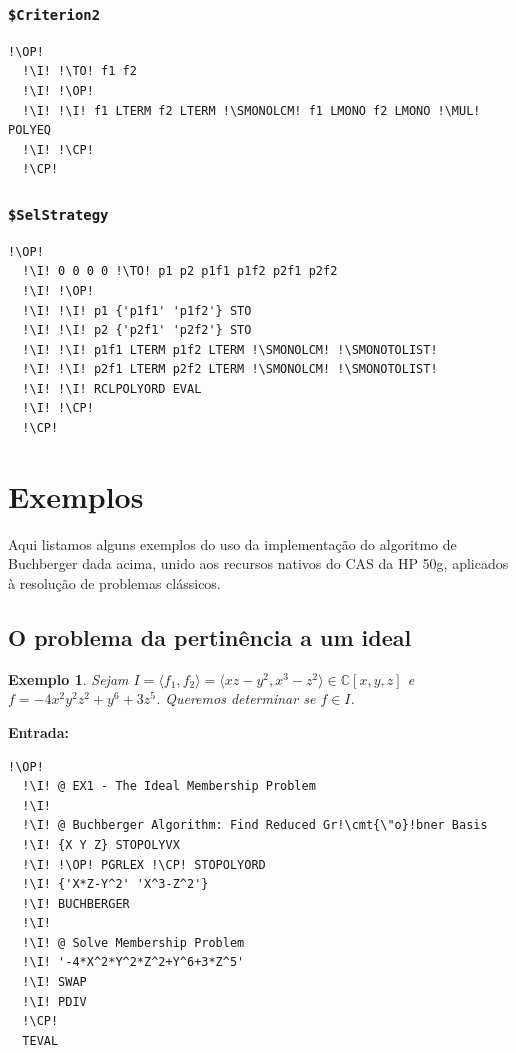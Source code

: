 \documentclass[12pt,a4paper]{report}
\newcommand{\kwd}[1]{\texttt{\textcolor{keyword}{#1}}}
\newcommand{\cmt}[1]{\texttt{\textcolor{comment}{#1}}}
\newcommand{\I}{\enspace\textcolor{indent}\vrule\hspace{2pt}}
\newcommand{\MUL}{\kwd{*}}   %
\newcommand{\SMONOTOLIST}{\kwd{\$MONO{$\rightarrow$}LIST}}   %
\newcommand{\SMONOLCM}{\kwd{\$MONOLCM}}   %
\newcommand{\SCriterionTwo}{\kwd{\$Criterion2}}   %
\newcommand{\SSelStrategy}{\kwd{\$SelStrategy}}   %
\newcommand{\OP}{\kwd{$\ll$}}   %
\newcommand{\CP}{\kwd{$\gg$}}   %
\newcommand{\TO}{\kwd{$\rightarrow$}} %
\newcommand{\C}{\mathbb{C}}
\newtheorem{example}[theorem]{Exemplo}
\numberwithin{theorem}{chapter}
\begin{document}
\subsubsection{\SCriterionTwo}\label{SCriterionTwo}
\begin{lstlisting}[language=userrpl]
  !\OP!
  !\I! !\TO! f1 f2
  !\I! !\OP!
  !\I! !\I! f1 LTERM f2 LTERM !\SMONOLCM! f1 LMONO f2 LMONO !\MUL! POLYEQ
  !\I! !\CP!
  !\CP!
\end{lstlisting}

\subsubsection{\SSelStrategy}\label{SSelStrategy}
\begin{lstlisting}[language=userrpl]
  !\OP!
  !\I! 0 0 0 0 !\TO! p1 p2 p1f1 p1f2 p2f1 p2f2
  !\I! !\OP!
  !\I! !\I! p1 {'p1f1' 'p1f2'} STO
  !\I! !\I! p2 {'p2f1' 'p2f2'} STO
  !\I! !\I! p1f1 LTERM p1f2 LTERM !\SMONOLCM! !\SMONOTOLIST!
  !\I! !\I! p2f1 LTERM p2f2 LTERM !\SMONOLCM! !\SMONOTOLIST!
  !\I! !\I! RCLPOLYORD EVAL
  !\I! !\CP!
  !\CP!
\end{lstlisting}



\section{Exemplos}\label{buchex}

Aqui listamos alguns exemplos do uso da implementação do algoritmo de
Buchberger dada acima, unido aos recursos nativos do CAS da HP 50g,
aplicados à resolução de problemas clássicos.


\subsection{O problema da pertinência a um ideal}

\begin{example}
  Sejam \(I=\langle f_1, f_2 \rangle = \langle x z - y^2, x^3-z^2
  \rangle \in \C[x,y,z]\) e \(f = -4x^2y^2z^2+y^6+3z^5\). Queremos
  determinar se \(f \in I\).
\end{example}

\noindent\textbf{Entrada:}

\begin{lstlisting}[language=userrpl]
  !\OP!
  !\I! @ EX1 - The Ideal Membership Problem
  !\I!
  !\I! @ Buchberger Algorithm: Find Reduced Gr!\cmt{\"o}!bner Basis
  !\I! {X Y Z} STOPOLYVX
  !\I! !\OP! PGRLEX !\CP! STOPOLYORD
  !\I! {'X*Z-Y^2' 'X^3-Z^2'}
  !\I! BUCHBERGER
  !\I!
  !\I! @ Solve Membership Problem
  !\I! '-4*X^2*Y^2*Z^2+Y^6+3*Z^5'
  !\I! SWAP
  !\I! PDIV
  !\CP!
  TEVAL
\end{lstlisting}
\end{document}

